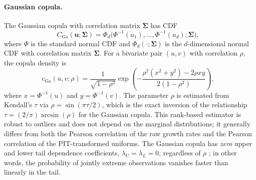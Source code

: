 \paragraph{Gaussian copula.}
The Gaussian copula with correlation matrix $\mathbf{\Sigma}$ has CDF
\begin{equation}
    C_{\text{Ga}}(\mathbf{u}; \mathbf{\Sigma}) = \Phi_d\bigl(\Phi^{-1}(u_1), \dots, \Phi^{-1}(u_d); \mathbf{\Sigma}\bigr),
\end{equation}
where $\Phi$ is the standard normal CDF and $\Phi_d(\cdot; \mathbf{\Sigma})$ is the $d$-dimensional normal CDF with correlation matrix $\mathbf{\Sigma}$. For a bivariate pair $(u, v)$ with correlation $\rho$, the copula density is
\begin{equation}
    c_{\text{Ga}}(u, v; \rho) = \frac{1}{\sqrt{1 - \rho^2}} \exp\!\left(-\frac{\rho^2(x^2 + y^2) - 2\rho xy}{2(1 - \rho^2)}\right),
    \label{eq:gauss_density}
\end{equation}
where $x = \Phi^{-1}(u)$ and $y = \Phi^{-1}(v)$. The parameter $\rho$ is estimated from Kendall's $\tau$ via $\rho = \sin(\pi\tau/2)$, which is the exact inversion of the relationship $\tau = (2/\pi)\arcsin(\rho)$ for the Gaussian copula. This rank-based estimator is robust to outliers and does not depend on the marginal distributions; it generally differs from both the Pearson correlation of the raw growth rates and the Pearson correlation of the PIT-transformed uniforms. The Gaussian copula has \emph{zero} upper and lower tail dependence coefficients, $\lambda_U = \lambda_L = 0$, regardless of $\rho$ \cite{embrechts_copulas_2002}; in other words, the probability of jointly extreme observations vanishes faster than linearly in the tail.

